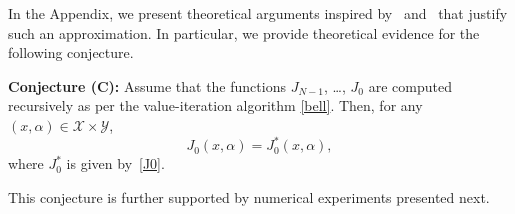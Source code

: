 \documentclass[letterpaper, 10 pt, conference]{ieeeconf}  %
\newtheorem{remark}{Remark}
\begin{document}
In the Appendix, we present theoretical arguments inspired by~\cite{chow2015risk} and~\cite[Sec. 1.5]{bertsekas2005dynamic} 
that justify such an approximation. In particular, we provide theoretical evidence for the following conjecture.  

{\bf Conjecture (C):}
Assume that the functions $J_{N-1}$, \dots, $J_0$ are computed recursively as per the value-iteration algorithm \eqref{bell}. 
Then, for any $(x, \alpha) \in \mathcal{X} \times \mathcal{Y}$,
\begin{equation}
\label{thm:eq}
J_0(x,\alpha) = J_0^*(x, \alpha),
\end{equation}
where $J_0^*$ is given by~\eqref{J0}.

This conjecture is further supported by numerical experiments presented next.
%
\end{document}
